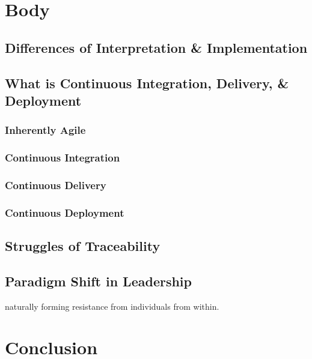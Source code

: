 \documentclass[11pt,a4paper]{article}
\begin{document}
\section{Body}
	\subsection{Differences of Interpretation \& Implementation}
	\subsection{What is Continuous Integration, Delivery, \& Deployment}
		\subsubsection{Inherently Agile}
		\subsubsection{Continuous Integration}
		\subsubsection{Continuous Delivery}
		\subsubsection{Continuous Deployment}
	\subsection{Struggles of Traceability}
	\subsection{Paradigm Shift in Leadership}
	naturally forming resistance from individuals from within.

\section{Conclusion}

\newpage
\end{document}
